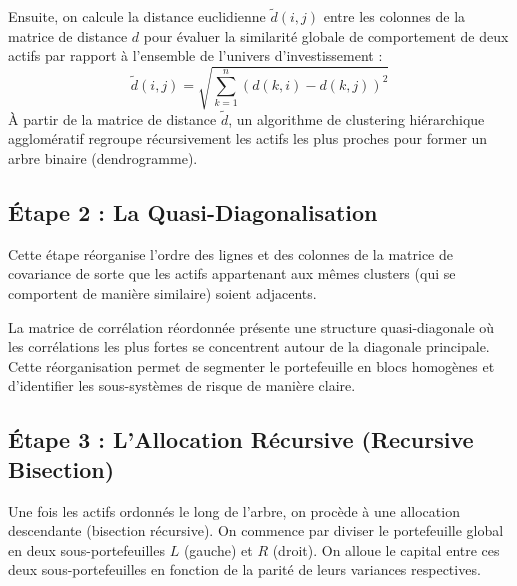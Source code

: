 Ensuite, on calcule la distance euclidienne $\tilde{d}(i, j)$ entre les colonnes de la matrice de distance $d$ pour évaluer la similarité globale de comportement de deux actifs par rapport à l'ensemble de l'univers d'investissement :
\begin{equation}
    \tilde{d}(i, j) = \sqrt{\sum_{k=1}^{n} \left( d(k, i) - d(k, j) \right)^2}
\end{equation}
À partir de la matrice de distance $\tilde{d}$, un algorithme de clustering hiérarchique agglomératif regroupe récursivement les actifs les plus proches pour former un arbre binaire (dendrogramme).

\subsection{Étape 2 : La Quasi-Diagonalisation}
Cette étape réorganise l'ordre des lignes et des colonnes de la matrice de covariance de sorte que les actifs appartenant aux mêmes clusters (qui se comportent de manière similaire) soient adjacents. 

La matrice de corrélation réordonnée présente une structure quasi-diagonale où les corrélations les plus fortes se concentrent autour de la diagonale principale. Cette réorganisation permet de segmenter le portefeuille en blocs homogènes et d'identifier les sous-systèmes de risque de manière claire.

\subsection{Étape 3 : L'Allocation Récursive (Recursive Bisection)}
Une fois les actifs ordonnés le long de l'arbre, on procède à une allocation descendante (bisection récursive). On commence par diviser le portefeuille global en deux sous-portefeuilles $L$ (gauche) et $R$ (droit). On alloue le capital entre ces deux sous-portefeuilles en fonction de la parité de leurs variances respectives.

